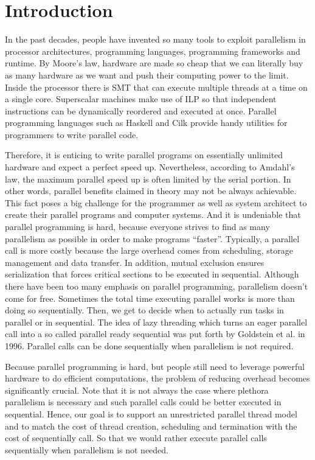 \section{Introduction}

In the past decades, people have invented so many tools to exploit parallelism in processor architectures, programming languages, programming frameworks and runtime.  By Moore's law, hardware are made so cheap that we can literally buy as many hardware as we want and push their computing power to the limit. Inside the processor there is SMT that can execute multiple threads at a time on a single core. Superscalar machines make use of ILP so that independent instructions can be dynamically reordered and executed at once. Parallel programming languages such as Haskell and Cilk provide handy utilities for programmers to write parallel code. 

Therefore, it is enticing to write parallel programs on essentially unlimited hardware and expect a perfect speed up. Nevertheless, according to Amdahl's law, the maximum parallel speed up is often limited by the serial portion. In other words, parallel benefits claimed in theory may not be always achievable. This fact poses a big challenge for the programmer as well as system architect to create their parallel programs and computer systems. And it is undeniable that parallel programming is hard, because everyone strives to find as many parallelism as possible in order to make programs ``faster''. Typically, a parallel call is more costly because the large overhead comes from scheduling, storage management and data transfer. In addition, mutual exclusion ensures serialization that forces critical sections to be executed in sequential. Although there have been too many emphasis on parallel programming, parallelism doesn't come for free. Sometimes the total time executing parallel works is more than doing so sequentially. Then, we get to decide when to actually run tasks in parallel or in sequential. The idea of lazy threading which turns an eager parallel call into a so called parallel ready sequential was put forth by Goldstein et al. in 1996. Parallel calls can be done sequentially when parallelism is not required.

Because parallel programming is hard, but people still need to leverage powerful hardware to do efficient computations, the problem of reducing overhead becomes significantly crucial. Note that it is not always the case where plethora parallelism is necessary and such parallel calls could be better executed in sequential. Hence, our goal is to support an unrestricted parallel thread model and to match the cost of thread creation, scheduling and termination with the cost of sequentially call. So that we would rather execute parallel calls sequentially when parallelism is not needed. 

